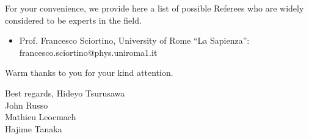 \documentclass[11pt]{article}
\begin{document}
\vskip 0.3cm
\noindent
For your convenience, we provide here a list of possible Referees who are widely considered to be experts in the field.

\begin{itemize}
 \item Prof. Francesco Sciortino, University of Rome ``La Sapienza'':
 francesco.sciortino@phys.uniroma1.it
\end{itemize}


\vskip 0.3cm
\noindent
Warm thanks to you for your kind attention.

\vskip 0.8cm

\noindent
Best regards,
\vskip 0.3cm
\indent Hideyo Tsurusawa\\
\indent John Russo\\
\indent Mathieu Leocmach\\
\indent Hajime Tanaka
\end{document}
